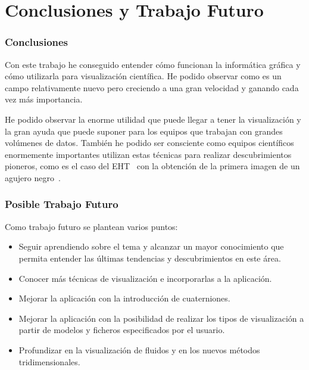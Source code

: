 \cleardoublepage

\chapter{Conclusiones y Trabajo Futuro}
\label{makereference6}

\subsection{Conclusiones}

Con este trabajo he conseguido entender cómo funcionan la informática gráfica y
cómo utilizarla para visualización científica. He podido observar como es un
campo relativamente nuevo pero creciendo a una gran velocidad y ganando cada vez
más importancia.

He podido observar la enorme utilidad que puede llegar a tener la visualización
y la gran ayuda que puede suponer para los equipos que trabajan con grandes
volúmenes de datos. También he podido ser consciente como equipos científicos
enormemente importantes utilizan estas técnicas para realizar descubrimientos
pioneros, como es el caso del EHT~\cite{EHT} con la obtención de la primera imagen
de un agujero negro~\cite{1435174}.

\subsection{Posible Trabajo Futuro}
Como trabajo futuro se plantean varios puntos:

\begin{itemize}

		\item Seguir aprendiendo sobre el tema y alcanzar un mayor
				conocimiento que permita entender las últimas tendencias y
				descubrimientos en este área.

		\item Conocer más técnicas de visualización e incorporarlas a la
				aplicación.

		\item Mejorar la aplicación con la introducción de cuaterniones.

		\item Mejorar la aplicación con la posibilidad de realizar los tipos
				de visualización a partir de modelos y ficheros especificados
				por el usuario.

		\item Profundizar en la visualización de fluidos y en los nuevos
				métodos tridimensionales.

\end{itemize}
